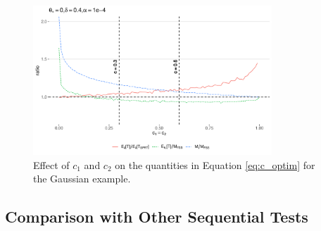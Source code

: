\documentclass[11pt]{article}
\begin{document}
\begin{figure}
\centering
\includegraphics[width=0.8\textwidth]{images/c1_c2_ratios}
\caption{Effect of $c_1$ and $c_2$ on the quantities in Equation \ref{eq:c_optim} for the Gaussian example.}
\end{figure}

\subsection{Comparison with Other Sequential Tests}\label{sec:comparisons}
\end{document}

